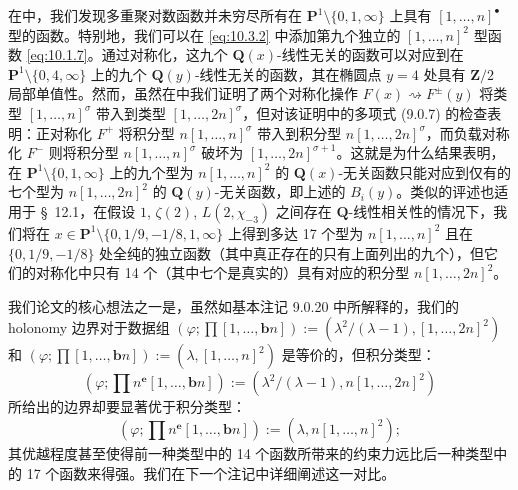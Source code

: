 在中，我们发现多重聚对数函数并未穷尽所有在 $\mathbf{P}^1 \setminus \{0,1,\infty\}$ 上具有 $[1,\dots,n]^{\bullet}$ 型的函数。特别地，我们可以在 \eqref{eq:10.3.2} 中添加第九个独立的 $[1, \dots, n]^2$ 型函数 \eqref{eq:10.1.7}。通过对称化，这九个 $\mathbf{Q}(x)$-线性无关的函数可以对应到在 $\mathbf{P}^1 \setminus \{0,4,\infty\}$ 上的九个 $\mathbf{Q}(y)$-线性无关的函数，其在椭圆点 $y = 4$ 处具有 $\mathbf{Z}/2$ 局部单值性。然而，虽然在中我们证明了两个对称化操作 $F(x) \rightsquigarrow F^{\pm}(y)$ 将类型 $[1,\dots,n]^{\sigma}$ 带入到类型 $[1,\dots,2n]^{\sigma}$，但对该证明中的多项式 (9.0.7) 的检查表明：正对称化 $F^+$ 将积分型 $n[1,\dots,n]^{\sigma}$ 带入到积分型 $n[1,\dots,2n]^{\sigma}$，而负载对称化 $F^-$ 则将积分型 $n[1,\dots,n]^{\sigma}$ 破坏为 $[1,\dots,2n]^{\sigma+1}$。这就是为什么结果表明，在 $\mathbf{P}^1 \setminus \{0,1,\infty\}$ 上的九个型为 $n[1,\dots,n]^2$ 的 $\mathbf{Q}(x)$-无关函数只能对应到仅有的七个型为 $n[1,\dots,2n]^2$ 的 $\mathbf{Q}(y)$-无关函数，即上述的 $B_i(y)$。类似的评述也适用于 \S~12.1，在假设 $1$, $\zeta(2)$, $L(2, \chi_{-3})$ 之间存在 $\mathbf{Q}$-线性相关性的情况下，我们将在 $x \in \mathbf{P}^1 \setminus \{0, 1/9, -1/8, 1, \infty\}$ 上得到多达 17 个型为 $n[1, \dots, n]^2$ 且在 $\{0, 1/9, -1/8\}$ 处全纯的独立函数（其中真正存在的只有上面列出的九个），但它们的对称化中只有 14 个（其中七个是真实的）具有对应的积分型 $n[1, \dots, 2n]^2$。

我们论文的核心想法之一是，虽然如基本注记 9.0.20 中所解释的，我们的 holonomy 边界对于数据组 $(\varphi; \prod[1,\dots,\mathbf{b}n]) := (\lambda^2/(\lambda-1),[1,\dots,2n]^2)$ 和 $(\varphi;\prod[1,\dots,\mathbf{b}n]) := (\lambda,[1,\dots,n]^2)$ 是等价的，但积分类型：
\[ (\varphi; \prod n^{\mathbf{e}}[1,\dots,\mathbf{b}n]) := (\lambda^2/(\lambda-1), n[1,\dots,2n]^2) \]
所给出的边界却要显著优于积分类型：
\[ (\varphi; \prod n^{\mathbf{e}}[1,\dots,\mathbf{b}n]) := (\lambda, n[1,\dots,n]^2); \]
其优越程度甚至使得前一种类型中的 14 个函数所带来的约束力远比后一种类型中的 17 个函数来得强。我们在下一个注记中详细阐述这一对比。

